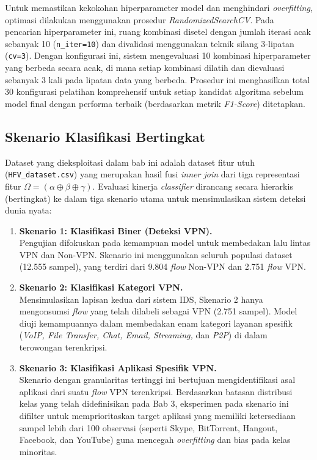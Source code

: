 Untuk memastikan kekokohan hiperparameter model dan menghindari \textit{overfitting}, optimasi dilakukan menggunakan prosedur \textit{RandomizedSearchCV}. Pada pencarian hiperparameter ini, ruang kombinasi disetel dengan jumlah iterasi acak sebanyak 10 (\texttt{n\_iter=10}) dan divalidasi menggunakan teknik silang 3-lipatan (\texttt{cv=3}). Dengan konfigurasi ini, sistem mengevaluasi 10 kombinasi hiperparameter yang berbeda secara acak, di mana setiap kombinasi dilatih dan dievaluasi sebanyak 3 kali pada lipatan data yang berbeda. Prosedur ini menghasilkan total 30 konfigurasi pelatihan komprehensif untuk setiap kandidat algoritma sebelum model final dengan performa terbaik (berdasarkan metrik \textit{F1-Score}) ditetapkan.

\subsection{Skenario Klasifikasi Bertingkat}

Dataset yang dieksploitasi dalam bab ini adalah dataset fitur utuh (\texttt{HFV\_dataset.csv}) yang merupakan hasil fusi \textit{inner join} dari tiga representasi fitur $\Omega = (\alpha \oplus \beta \oplus \gamma)$. Evaluasi kinerja \textit{classifier} dirancang secara hierarkis (bertingkat) ke dalam tiga skenario utama untuk mensimulasikan sistem deteksi dunia nyata:

\begin{enumerate}
    \item \textbf{Skenario 1: Klasifikasi Biner (Deteksi VPN).} \\
    Pengujian difokuskan pada kemampuan model untuk membedakan lalu lintas VPN dan Non-VPN. Skenario ini menggunakan seluruh populasi dataset (12.555 sampel), yang terdiri dari 9.804 \textit{flow} Non-VPN dan 2.751 \textit{flow} VPN.
    
    \item \textbf{Skenario 2: Klasifikasi Kategori VPN.} \\
    Mensimulasikan lapisan kedua dari sistem IDS, Skenario 2 hanya mengonsumsi \textit{flow} yang telah dilabeli sebagai VPN (2.751 sampel). Model diuji kemampuannya dalam membedakan enam kategori layanan spesifik (\textit{VoIP, File Transfer, Chat, Email, Streaming,} dan \textit{P2P}) di dalam terowongan terenkripsi.
    
    \item \textbf{Skenario 3: Klasifikasi Aplikasi Spesifik VPN.} \\
    Skenario dengan granularitas tertinggi ini bertujuan mengidentifikasi asal aplikasi dari suatu \textit{flow} VPN terenkripsi. Berdasarkan batasan distribusi kelas yang telah didefinisikan pada Bab 3, eksperimen pada skenario ini difilter untuk memprioritaskan target aplikasi yang memiliki ketersediaan sampel lebih dari 100 observasi (seperti Skype, BitTorrent, Hangout, Facebook, dan YouTube) guna mencegah \textit{overfitting} dan bias pada kelas minoritas.
\end{enumerate}

